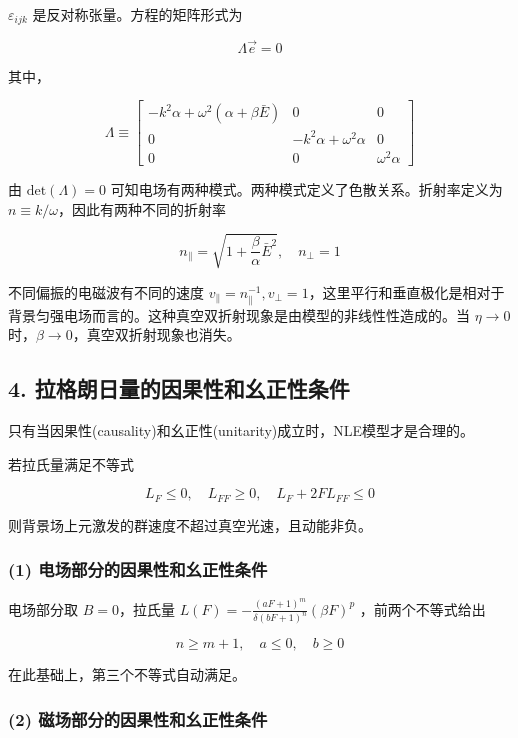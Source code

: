 \documentclass[aps,prl,preprint,groupedaddress,showkeys]{revtex4-2}
\begin{document}
$\varepsilon_{ijk} $ 是反对称张量。方程的矩阵形式为

$$
\Lambda \vec{e} = 0 
$$

其中，

$$
\Lambda
\equiv \begin{bmatrix}
-k^2 \alpha+\omega^2\left(\alpha+\beta\bar{E} \right) &0 &0 \\
0 &-k^2\alpha+\omega^2\alpha &0 \\
0 &0 &\omega^2\alpha
\end{bmatrix} 
$$

由 $\mathrm{det}(\Lambda)=0 $ 可知电场有两种模式。两种模式定义了色散关系。折射率定义为 $n\equiv k/\omega $，因此有两种不同的折射率

$$
n_\parallel = \sqrt{1+\frac{\beta }{\alpha } \bar{E}^2},\quad
n_\perp = 1 
$$

不同偏振的电磁波有不同的速度 $v_\parallel=n_\parallel^{-1},v_\perp=1 $，这里平行和垂直极化是相对于背景匀强电场而言的。这种真空双折射现象是由模型的非线性性造成的。当 $\eta\to 0$ 时，$\beta\to 0$，真空双折射现象也消失。

\subsection{4. 拉格朗日量的因果性和幺正性条件}

只有当因果性(causality)和幺正性(unitarity)成立时，NLE模型才是合理的\cite{shabad2011effective}。

若拉氏量满足不等式

$$
L_F \leq 0,\quad
L_{FF}\geq 0,\quad
L_F + 2F L_{FF} \leq 0
$$

则背景场上元激发的群速度不超过真空光速，且动能非负。

\subsubsection{(1) 电场部分的因果性和幺正性条件}

电场部分取 $B=0 $，拉氏量 $\displaystyle{L(F)=-\frac{\left(aF+1 \right)^m }{\delta(bF+1)^n } \left(\beta F \right)^p }$ ，前两个不等式给出

$$
n\geq m+1,\quad a\leq 0,\quad b\geq 0
$$

在此基础上，第三个不等式自动满足。

\subsubsection{(2) 磁场部分的因果性和幺正性条件}
\end{document}
